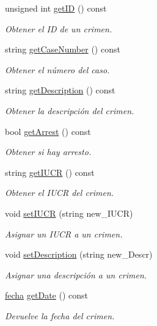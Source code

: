 \begin{DoxyCompactItemize}
unsigned int \hyperlink{classcrimen_abc39a10bdf42cbc38f51872cbf02c69d}{get\+I\+D} () const 
\begin{DoxyCompactList}\small\item\em Obtener el I\+D de un crimen. \end{DoxyCompactList}\item 
string \hyperlink{classcrimen_ab3c025eb20cdcea9192ee190fa2af015}{get\+Case\+Number} () const 
\begin{DoxyCompactList}\small\item\em Obtener el número del caso. \end{DoxyCompactList}\item 
string \hyperlink{classcrimen_a61789d65209d167149df197272d8feba}{get\+Description} () const 
\begin{DoxyCompactList}\small\item\em Obtener la descripción del crimen. \end{DoxyCompactList}\item 
bool \hyperlink{classcrimen_a6cab67bfdad566ce444236fc7c8df312}{get\+Arrest} () const 
\begin{DoxyCompactList}\small\item\em Obtener si hay arresto. \end{DoxyCompactList}\item 
string \hyperlink{classcrimen_a8738020069c3a3b3500d044f9580f93a}{get\+I\+U\+C\+R} () const 
\begin{DoxyCompactList}\small\item\em Obtener el I\+U\+C\+R del crimen. \end{DoxyCompactList}\item 
void \hyperlink{classcrimen_a1f64e937436244d47af1f92cb63c7254}{set\+I\+U\+C\+R} (string new\+\_\+\+I\+U\+C\+R)
\begin{DoxyCompactList}\small\item\em Asignar un I\+U\+C\+R a un crimen. \end{DoxyCompactList}\item 
void \hyperlink{classcrimen_aa2f141046bf44d87e5bc25ae197dcbd0}{set\+Description} (string new\+\_\+\+Descr)
\begin{DoxyCompactList}\small\item\em Asignar una descripción a un crimen. \end{DoxyCompactList}\item 
\hyperlink{classfecha}{fecha} \hyperlink{classcrimen_a8a6712e536211034819441ab87e1c215}{get\+Date} () const 
\begin{DoxyCompactList}\small\item\em Devuelve la fecha del crimen. \end{DoxyCompactList}\item 

\end{DoxyCompactItemize}
